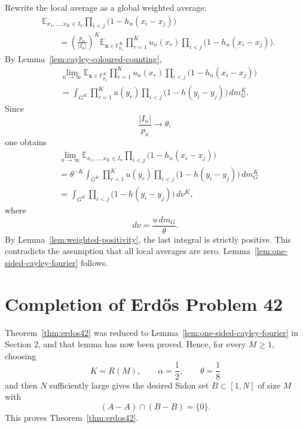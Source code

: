 \documentclass[11pt]{article}
\numberwithin{equation}{section}
\newcommand{\E}{\mathbb E}
\newcommand{\F}{\mathbb F}
\newcommand{\1}{\mathbf 1}
\begin{document}
Rewrite the local average as a global weighted average:
\[
\begin{aligned}
&\E_{x_1,\ldots,x_K\in I_n}
        \prod_{i<j}
        \bigl(1-h_n(x_i-x_j)\bigr)                              \\
&\qquad =
\left(\frac{p_n}{|I_n|}\right)^K
\E_{\mathbf x\in\F_{p_n}^K}
        \prod_{r=1}^K u_n(x_r)
        \prod_{i<j}
        \bigl(1-h_n(x_i-x_j)\bigr).
\end{aligned}
\]
By Lemma~\ref{lem:cayley-coloured-counting},
\[
\begin{aligned}
&\lim_{n\to\infty}
\E_{\mathbf x\in\F_{p_n}^K}
        \prod_{r=1}^K u_n(x_r)
        \prod_{i<j}
        \bigl(1-h_n(x_i-x_j)\bigr)                              \\
&=\int_{G^K}
        \prod_{r=1}^K u(y_r)
        \prod_{i<j}
        \bigl(1-h(y_i-y_j)\bigr)\,dm_G^K.
\end{aligned}
\]
Since
\[
        \frac{|I_n|}{p_n}\to\theta,
\]
one obtains
\[
\begin{aligned}
&\lim_{n\to\infty}
\E_{x_1,\ldots,x_K\in I_n}
        \prod_{i<j}
        \bigl(1-h_n(x_i-x_j)\bigr)                              \\
&=
\theta^{-K}
\int_{G^K}
        \prod_{r=1}^K u(y_r)
        \prod_{i<j}
        \bigl(1-h(y_i-y_j)\bigr)\,dm_G^K                         \\
&=
\int_{G^K}
        \prod_{i<j}
        \bigl(1-h(y_i-y_j)\bigr)\,d\nu^K,
\end{aligned}
\]
where
\[
        d\nu=\frac{u\,dm_G}{\theta}.
\]
By Lemma~\ref{lem:weighted-positivity}, the last integral is strictly
positive.  This contradicts the assumption that all local averages are
zero.  Lemma~\ref{lem:one-sided-cayley-fourier} follows.

\section{Completion of Erd\H{o}s Problem 42}

Theorem~\ref{thm:erdos42} was reduced to
Lemma~\ref{lem:one-sided-cayley-fourier} in Section 2, and that lemma has
now been proved.  Hence, for every \(M\ge1\), choosing
\[
        K=R(M),\qquad \alpha=\frac12,
        \qquad \theta=\frac18
\]
and then \(N\) sufficiently large gives the desired Sidon set
\(B\subset[1,N]\) of size \(M\) with
\[
        (A-A)\cap(B-B)=\{0\}.
\]
This proves Theorem~\ref{thm:erdos42}.

\appendix
\end{document}
